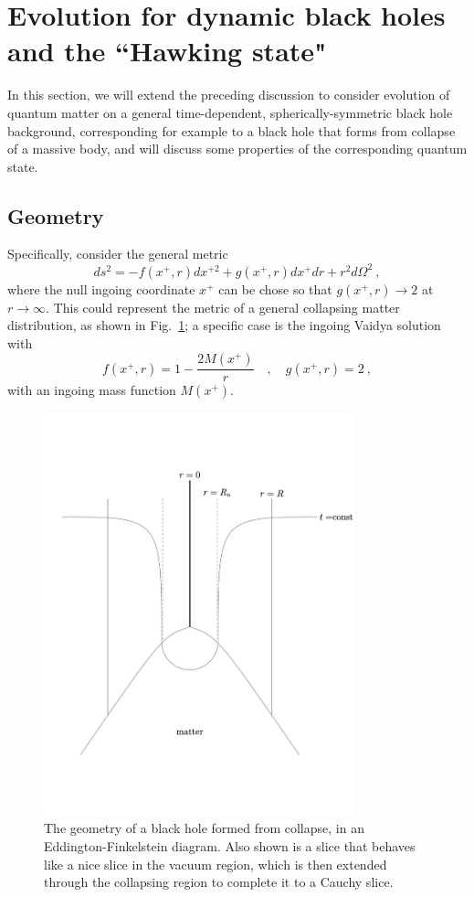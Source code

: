 \documentclass[12pt]{article}
\numberwithin{equation}{section}
\newcommand{\beq}{\begin{equation}}
\newcommand{\eeq}{\end{equation}}
\begin{document}
\section{Evolution for dynamic black holes and the ``Hawking state"}
\label{BHevol}

In this section, we will extend the preceding discussion to consider evolution of quantum matter on a general time-dependent, spherically-symmetric black hole background, corresponding for example to a black hole that forms from collapse of a massive body, and will discuss some properties of the corresponding quantum state.  

\subsection{Geometry}


Specifically, consider the general metric
\beq\label{gmet}
ds^2 = -f(x^+,r) dx^{+2} + g(x^+,r) dx^+ dr + r^2 d\Omega^2\ ,
\eeq
where the null ingoing coordinate $x^+$ can be chose so that  $g(x^+,r)\rightarrow 2$ at $r\rightarrow\infty$.  This could represent the metric of a general collapsing matter distribution, as shown in Fig.~\ref{Collapse}; a specific case is the ingoing Vaidya solution with
\beq \label{fVaid}
f(x^+,r)= 1-\frac{2M(x^+)}{r}\quad,\quad g(x^+,r)=2\ ,
\eeq
with an ingoing mass function $M(x^+)$.

\begin{figure}[!hbtp] \begin{center}
\includegraphics[width=9cm]{fig2largetext.pdf}
\end{center}
\caption{The geometry of a black hole formed from collapse, in an Eddington-Finkelstein diagram.  Also shown is a slice that behaves like a nice slice in the vacuum region, which is then extended through  the collapsing region to complete it to a Cauchy slice.}
\label{Collapse}
\end{figure} 
\end{document}
